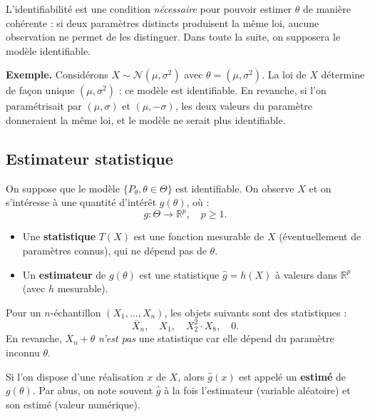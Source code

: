 \begin{remarque}
L'identifiabilité est une condition \emph{nécessaire} pour pouvoir estimer $\theta$ de manière cohérente : si deux paramètres distincts produisent la même loi, aucune observation ne permet de les distinguer. Dans toute la suite, on supposera le modèle identifiable.

\medskip

\textbf{Exemple.} Considérons $X \sim \mathcal{N}(\mu, \sigma^2)$ avec $\theta = (\mu, \sigma^2)$. La loi de $X$ détermine de façon unique $(\mu, \sigma^2)$ : ce modèle est identifiable. En revanche, si l'on paramétrisait par $(\mu, \sigma)$ et $(\mu, -\sigma)$, les deux valeurs du paramètre donneraient la même loi, et le modèle ne serait plus identifiable.
\end{remarque}

\subsection{Estimateur statistique}

On suppose que le modèle $\{P_\theta, \theta \in \Theta\}$ est identifiable.  
On observe $X$ et on s'intéresse à une quantité d'intérêt $g(\theta)$, où :
\[
g : \Theta \to \mathbb{R}^p, \quad p \geq 1.
\]

\begin{mdframed}
\begin{definition}
\begin{itemize}
  \item Une \textbf{statistique} $T(X)$ est une fonction mesurable de $X$ (éventuellement de paramètres connus), qui ne dépend pas de $\theta$.
  \item Un \textbf{estimateur} de $g(\theta)$ est une statistique $\hat{g} = h(X)$ à valeurs dans $\mathbb{R}^p$ (avec $h$ mesurable).
\end{itemize}
\end{definition}
\end{mdframed}

\begin{exemple}
Pour un $n$-échantillon $(X_1,\ldots,X_n)$, les objets suivants sont des statistiques :
\[
\overline{X}_n, \quad X_1, \quad X_2^2 \cdot X_8, \quad 0.
\]
En revanche, $\overline{X}_n + \theta$ \emph{n'est pas} une statistique car elle dépend du paramètre inconnu $\theta$.
\end{exemple}

\begin{remarque}
Si l'on dispose d'une réalisation $x$ de $X$, alors $\hat{g}(x)$ est appelé un \textbf{estimé} de $g(\theta)$.  
Par abus, on note souvent $\hat{g}$ à la fois l'estimateur (variable aléatoire) et son estimé (valeur numérique).
\end{remarque}

